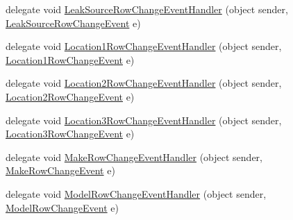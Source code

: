 \begin{DoxyCompactItemize}
\item 
delegate void \hyperlink{class_env_int_1_1_win32_1_1_field_tech_1_1_manager_1_1_data_sets_1_1_guide_ware_mobile_data_set_a9dd35aa7852f0dab912fa474e360b454}{Leak\+Source\+Row\+Change\+Event\+Handler} (object sender, \hyperlink{class_env_int_1_1_win32_1_1_field_tech_1_1_manager_1_1_data_sets_1_1_guide_ware_mobile_data_set_86c0d6f3fd40b47433420931434d32a7}{Leak\+Source\+Row\+Change\+Event} e)
\item 
delegate void \hyperlink{class_env_int_1_1_win32_1_1_field_tech_1_1_manager_1_1_data_sets_1_1_guide_ware_mobile_data_set_ae3a4db5cb436e61b5641813fae964c22}{Location1\+Row\+Change\+Event\+Handler} (object sender, \hyperlink{class_env_int_1_1_win32_1_1_field_tech_1_1_manager_1_1_data_sets_1_1_guide_ware_mobile_data_set_1_1_location1_row_change_event}{Location1\+Row\+Change\+Event} e)
\item 
delegate void \hyperlink{class_env_int_1_1_win32_1_1_field_tech_1_1_manager_1_1_data_sets_1_1_guide_ware_mobile_data_set_a2de82c6aada07f571f168a4bf62f5bed}{Location2\+Row\+Change\+Event\+Handler} (object sender, \hyperlink{class_env_int_1_1_win32_1_1_field_tech_1_1_manager_1_1_data_sets_1_1_guide_ware_mobile_data_set_1_1_location2_row_change_event}{Location2\+Row\+Change\+Event} e)
\item 
delegate void \hyperlink{class_env_int_1_1_win32_1_1_field_tech_1_1_manager_1_1_data_sets_1_1_guide_ware_mobile_data_set_ab06bf43328e17eae771a2c07d051b9b3}{Location3\+Row\+Change\+Event\+Handler} (object sender, \hyperlink{class_env_int_1_1_win32_1_1_field_tech_1_1_manager_1_1_data_sets_1_1_guide_ware_mobile_data_set_1_1_location3_row_change_event}{Location3\+Row\+Change\+Event} e)
\item 
delegate void \hyperlink{class_env_int_1_1_win32_1_1_field_tech_1_1_manager_1_1_data_sets_1_1_guide_ware_mobile_data_set_a6eb1ddef39be33cf18a268b05cd32b4f}{Make\+Row\+Change\+Event\+Handler} (object sender, \hyperlink{class_env_int_1_1_win32_1_1_field_tech_1_1_manager_1_1_data_sets_1_1_guide_ware_mobile_data_set_1_1_make_row_change_event}{Make\+Row\+Change\+Event} e)
\item 
delegate void \hyperlink{class_env_int_1_1_win32_1_1_field_tech_1_1_manager_1_1_data_sets_1_1_guide_ware_mobile_data_set_a229f51edc1098ac0242fa8a6b9b52f8b}{Model\+Row\+Change\+Event\+Handler} (object sender, \hyperlink{class_env_int_1_1_win32_1_1_field_tech_1_1_manager_1_1_data_sets_1_1_guide_ware_mobile_data_set_1_1_model_row_change_event}{Model\+Row\+Change\+Event} e)
\item 

\end{DoxyCompactItemize}
